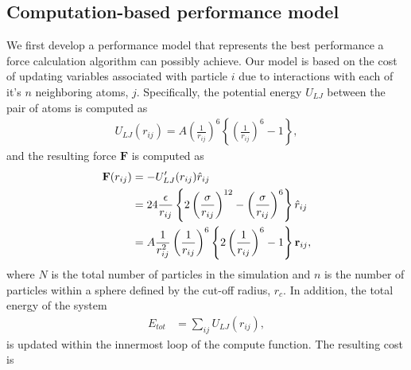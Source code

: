 \documentclass[12pt]{article}
\begin{document}
\subsection{Computation-based performance model}
\label{sec:comp-based-perf}
We first develop a performance model that represents the best
performance a force calculation algorithm can possibly achieve. Our
model is based on the cost of updating variables associated with
particle $i$ due to interactions with each of it's $n$ neighboring
atoms, $j$. Specifically, the potential energy $U_{LJ}$ between the
pair of atoms is computed as
\begin{align}
    U_{LJ}(r_{ij}) = A\left(\frac{1}{r_{ij}}\right)^{6}\left\{ \left(\frac{1}{r_{ij}}\right)^{6} - 1 \right\},           
\end{align}            
and the resulting force $\textbf{F}$ is computed as
\begin{align}
    \textbf{F}(r_{ij}) &= - U'_{LJ}(r_{ij})\hat{r}_{ij} \notag\\
        &= 24 \frac{\epsilon}{r_{ij}} \left\{ 2 \left(\frac{\sigma}{r_{ij}}\right)^{12}
              - \left(\frac{\sigma}{r_{ij}}\right)^6 \right\} \hat{r}_{ij} \notag\\
        &=  A \frac{1}{r_{ij}^2} \left(\frac{1}{r_{ij}}\right)^{6} \left\{ 2 \left(\frac{1}{r_{ij}}\right)^{6}
              - 1 \right\} \textbf{r}_{ij},
\end{align}
where $N$ is the total number of particles in the simulation and $n$
is the number of particles within a sphere defined by the cut-off
radius, $r_c$. In addition, the total energy of the system
\begin{align}
    E_{tot} &= \sum_{ij} U_{LJ}(r_{ij}),
\end{align}
is updated within the innermost loop of the compute function. The resulting cost is
\end{document}
